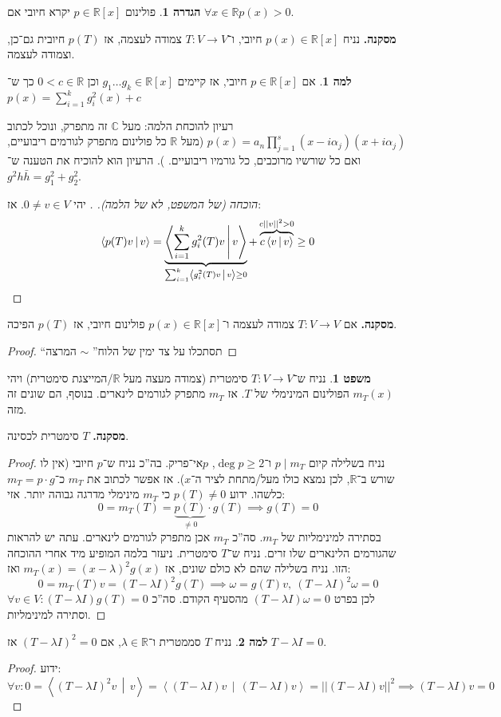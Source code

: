 \documentclass[a4paper]{article}
\newcommand\R     {\mathbb{R}}
\newcommand\C     {\mathbb{C}}
\newcommand\ra    {\rangle}
\newcommand\la    {\langle}
\newcommand\co        {\colon}
\newcommand\norm[1]   {\left \vert \left \vert #1 \right \vert \right \vert}
\newcommand\mut [2]   {\left \la #1 \,\middle\vert\, #2 \right \ra}
\newcommand\ag        {\alpha}
\renewcommand\lg      {\lambda}
\theoremstyle{definition}
\newtheorem{Theorem}{משפט}
\newtheorem{definition}{הגדרה}
\newtheorem{Lemma}{למה}
\newcommand\theo  [1] {\begin{Theorem}#1\end{Theorem}}
\newcommand\defi  [1] {\begin{definition}#1\end{definition}}
\newcommand\lem   [1] {\begin{Lemma}#1\end{Lemma}}
\begin{document}
	\defi{פולינום $p \in \R[x]$ יקרא חיובי אם $\forall x \in \R p(x) > 0$. }
	\textbf{מסקנה. }נניח $p(x) \in \R[x]$ חיובי, ו־$T \co V \to V$ צמודה לעצמה, אז $p(T)$ חיובית גם־כן, וצמודה לעצמה. 
	\lem{אם $p \in \R[x]$ חיובי, אז קיימים $g_1 \dots g_k \in \R[x]$ וכן $0 < c \in \R$ כך ש־$p(x) = \sum_{i = 1}^{k}g^2_i(x) + c$}
	רעיון להוכחת הלמה: מעל $\C$ זה מתפרק, ונוכל לכתוב $p(x) = a_n\prod_{j = 1}^{s} (x - i\ag_j)(x + i\ag_j)$ (מעל $\R$ כל פולינום מתפרק לגורמים ריבועיים, ואם כל שורשיו מרוכבים, כל גורמיו ריבועיים. ). הרעיון הוא להוכיח את הטענה ש־$g^2 h \bar h = g_1^2 + g_2^2$.
	\begin{proof}[הוכחה (של המשפט, לא של הלמה). ]
		יהי $0 \neq v \in V$. אז: 
		\[ \mut{p(T)v}{v} = \underbrace{\mut{\sum_{i = 1}^{k}g_i^2(T)v}{v}}_{\mathclap{\sum_{i = 1}^{k} \mut{g_i^2(T)v}{v}\ge 0}} + \overbrace{c\mut{v}{v}}^{c\norm{v}^2 > 0} \ge 0 \]
	\end{proof}
	\textbf{מסקנה. }אם $T \co V \to V$ צמודה לעצמה ו־$p(x) \in \R[x]$ פולינום חיובי, אז $p(T)$ הפיכה. 
	\begin{proof}
		``תסתכלו על צד ימין של הלוח'' $\sim$ המרצה
	\end{proof}
	\theo{נניח ש־$T \co V \to V$ סימטרית (צמודה מעצה מעל $\R$/המייצגת סימטרית) ויהי $m_T(x)$ הפולינום המינימלי של $T$. אז $m_T$ מתפרק לגורמים לינארים. בנוסף, הם שונים זה מזה. }
	\textbf{מסקנה. }$T$ סימטרית לכסינה. 
	\begin{proof}
		נניח בשלילה קיום $p \mid m_T$ ו־$\deg p \ge 2$, $p $אי־פריק. בה''כ נניח ש־$p$ חיובי (אין לו שורש ב־$\R$, לכן נמצא כולו מעל/מתחת לציר ה־$x$). אז אפשר לכתוב את $m_T$ כ־$m_T = p \cdot g$ כלשהו. ידוע $p(T) \neq 0$ כי $m_T$ מינימלי מדרגה גבוהה יותר. 
		אזי: 
		\[ 0 = m_T(T) = \underbrace{p(T)}_{\neq 0} \cdot g(T) \implies g(T) = 0 \]
		בסתירה למינימליות של $m_T$. סה''כ $m_T$ אכן מתפרק לגורמים לינארים. עתה יש להראות שהגורמים הלינארים שלו זרים. נניח ש־$T$ סימטרית. ניעזר בלמה המופיע מיד אחרי ההוכחה הזו. נניח בשלילה שהם לא כולם שונים, אז $m_T(x) = (x - \lg)^2g(x)$ ואז: 
		\[ 0 = m_T(T)v = (T - \lg I)^{2}g(T) \implies \omega = g(T)v, \ (T - \lg I)^2\omega = 0 \]
		לכן בפרט $(T - \lg I)\omega = 0$ מהסעיף הקודם. סה''כ $\forall v \in V \co (T - \lg I)g(T) = 0$ וסתירה למינימליות. 
	\end{proof}
	\lem{נניח $T$ סממטרית ו־$\lg \in \R$, אם $(T - \lg I)^{2} = 0$ אז $T - \lg I = 0$. }\begin{proof}
		ידוע: 
		\[ \forall v \co 0 = \mut{(T - \lg I)^{2}v}{v} = \mut{(T - \lg I)v}{(T - \lg I)v} = \norm{(T - \lg I)v}^2 \implies (T - \lg I)v = 0 \]
	\end{proof}
	
\end{document}
